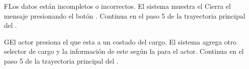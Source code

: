 \begin{UCtrayectoriaA}{F}{Los datos están incompletos o incorrectos.}
 \UCpaso El sistema muestra el 
 \UCpaso[\UCactor] Cierra el mensaje presionando el botón .
 \UCpaso Continua en el paso 5 de la trayectoria principal del .
\end{UCtrayectoriaA}
\begin{UCtrayectoriaA}{G}{El actor presiona el \IUbutton{+} que esta a un costado del cargo.}
 \UCpaso El sistema agrega otro selector de cargo y la información de este según la  para el actor.
 \UCpaso Continua en el paso 5 de la trayectoria principal del .
\end{UCtrayectoriaA}
